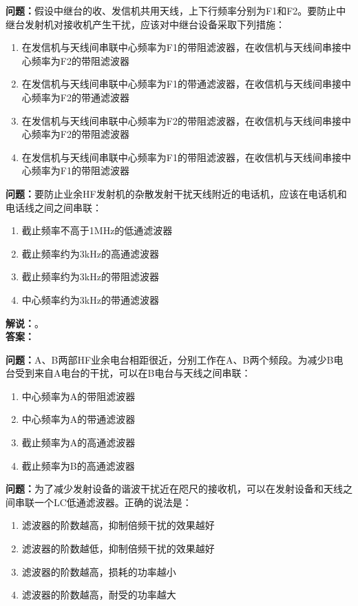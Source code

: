 \bigskip


\noindent\textbf{问题：}假设中继台的收、发信机共用天线，上下行频率分别为F1和F2。要防止中继台发射机对接收机产生干扰，应该对中继台设备采取下列措施：
\begin{enumerate}[label=\Alph*), leftmargin=3em]
\item 在发信机与天线间串联中心频率为F1的带阻滤波器，在收信机与天线间串接中心频率为F2的带阻滤波器
\item 在发信机与天线间串联中心频率为F1的带通滤波器，在收信机与天线间串接中心频率为F2的带通滤波器
\item 在发信机与天线间串联中心频率为F2的带阻滤波器，在收信机与天线间串接中心频率为F2的带阻滤波器
\item 在发信机与天线间串联中心频率为F1的带阻滤波器，在收信机与天线间串接中心频率为F1的带阻滤波器
\end{enumerate}

\bigskip


\noindent\textbf{问题：}要防止业余HF发射机的杂散发射干扰天线附近的电话机，应该在电话机和电话线之间之间串联：
\begin{enumerate}[label=\Alph*), leftmargin=3em]
\item 截止频率不高于1MHz的低通滤波器
\item 截止频率约为3kHz的高通滤波器
\item 截止频率约为3kHz的带阻滤波器
\item 中心频率约为3kHz的带通滤波器
\end{enumerate}
\noindent\textbf{解说：}。\\\noindent\textbf{答案：}

\bigskip


\noindent\textbf{问题：}A、B两部HF业余电台相距很近，分别工作在A、B两个频段。为减少B电台受到来自A电台的干扰，可以在B电台与天线之间串联：
\begin{enumerate}[label=\Alph*), leftmargin=3em]
\item 中心频率为A的带阻滤波器
\item 中心频率为A的带通滤波器
\item 截止频率为A的高通滤波器
\item 截止频率为B的高通滤波器
\end{enumerate}

\bigskip


\noindent\textbf{问题：}为了减少发射设备的谐波干扰近在咫尺的接收机，可以在发射设备和天线之间串联一个LC低通滤波器。正确的说法是：
\begin{enumerate}[label=\Alph*), leftmargin=3em]
\item 滤波器的阶数越高，抑制倍频干扰的效果越好
\item 滤波器的阶数越低，抑制倍频干扰的效果越好
\item 滤波器的阶数越高，损耗的功率越小
\item 滤波器的阶数越高，耐受的功率越大
\end{enumerate}

